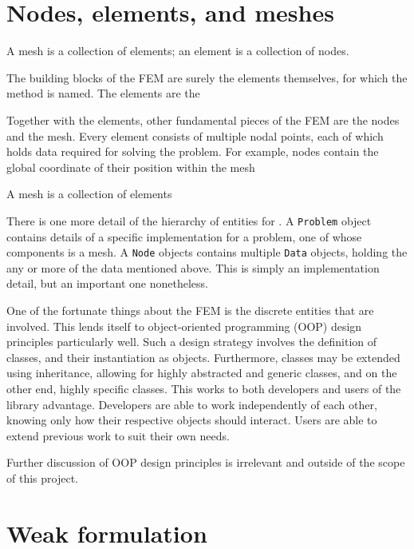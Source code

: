 
\section{Nodes, elements, and meshes}

A mesh is a collection of elements; an element is a collection of nodes.

The building blocks of the FEM are surely the elements themselves, for which the method is named.
The elements are the 

Together with the elements, other fundamental pieces of the FEM are the nodes and the mesh.
Every element consists of multiple nodal points, each of which holds data required for solving the problem.
For example, nodes contain the global coordinate of their position within the mesh

A mesh is a collection of elements


There is one more detail of the hierarchy of entities for \oomph.
A \texttt{Problem} object contains details of a specific implementation for a problem, one of whose components is a mesh.
A \texttt{Node} objects contains multiple \texttt{Data} objects, holding the any or more of the data mentioned above.
This is simply an implementation detail, but an important one nonetheless. 


One of the fortunate things about the FEM is the discrete entities that are involved.
This lends itself to object-oriented programming (OOP) design principles particularly well.
Such a design strategy involves the definition of classes, and their instantiation as objects.
Furthermore, classes may be extended using inheritance, allowing for highly abstracted and generic classes, and on the other end, highly specific classes.
This works to both developers and users of the library advantage.
Developers are able to work independently of each other, knowing only how their respective objects should interact.
Users are able to extend previous work to suit their own needs.

Further discussion of OOP design principles is irrelevant and outside of the scope of this project.





\section{Weak formulation}

